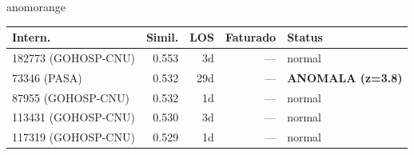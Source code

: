 \documentclass[a4paper,10pt]{article}
\begin{document}
\begin{anomalycard}[Internacao 60842 | PASA | ALTO (z=4.71)]{anomorange}
\begin{tabular}{l r r r l}\toprule\textbf{Intern.} & \textbf{Simil.} & \textbf{LOS} & \textbf{Faturado} & \textbf{Status} \\\midrule
182773 (GOHOSP-CNU) & 0.553 & 3d & --- & \textcolor{jcubeblue}{normal} \\
73346 (PASA) & 0.532 & 29d & --- & \textcolor{anomred}{\textbf{ANOMALA (z=3.8)}} \\
87955 (GOHOSP-CNU) & 0.532 & 1d & --- & \textcolor{jcubeblue}{normal} \\
113431 (GOHOSP-CNU) & 0.530 & 3d & --- & \textcolor{jcubeblue}{normal} \\
117319 (GOHOSP-CNU) & 0.529 & 1d & --- & \textcolor{jcubeblue}{normal} \\
\bottomrule\end{tabular}



\end{anomalycard}

\newpage
\end{document}
